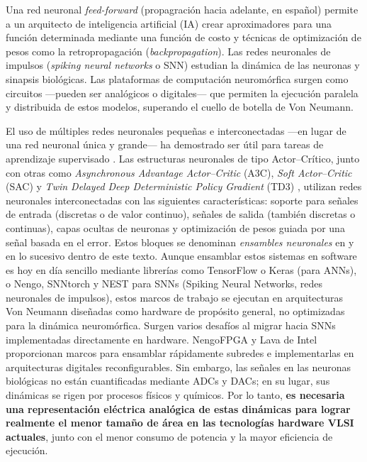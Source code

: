\documentclass[letter, 12pt]{article}
\begin{document}
Una red neuronal \textit{feed-forward} (propagración hacia adelante, en español) permite a un arquitecto de inteligencia artificial (IA) crear aproximadores para una función determinada mediante una función de costo y técnicas de optimización de pesos como la retropropagación (\textit{backpropagation}). Las redes neuronales de impulsos (\textit{spiking neural networks} o SNN) estudian la dinámica de las neuronas y sinapsis biológicas. Las plataformas de computación neuromórfica surgen como circuitos —pueden ser analógicos o digitales— que permiten la ejecución paralela y distribuida de estos modelos, superando el cuello de botella de Von Neumann.


El uso de múltiples redes neuronales pequeñas e interconectadas —en lugar de una red neuronal única y grande— ha demostrado ser útil para tareas de aprendizaje supervisado \cite{Zanatta2024}. Las estructuras neuronales de tipo Actor--Crítico, junto con otras como \textit{Asynchronous Advantage Actor--Critic} (A3C), \textit{Soft Actor--Critic} (SAC) y \textit{Twin Delayed Deep Deterministic Policy Gradient} (TD3) \cite{Sutton}, utilizan redes neuronales interconectadas con las siguientes características: soporte para señales de entrada (discretas o de valor continuo), señales de salida (también discretas o continuas), capas ocultas de neuronas y optimización de pesos guiada por una señal basada en el error. Estos bloques se denominan \emph{ensambles neuronales} en \cite{Morcos2019, Marrero2024NEF} y en lo sucesivo dentro de este texto. Aunque ensamblar estos sistemas en software es hoy en día sencillo mediante librerías como TensorFlow o Keras (para ANNs), o Nengo, SNNtorch y NEST para SNNs (Spiking Neural Networks, redes neuronales de impulsos), estos marcos de trabajo se ejecutan en arquitecturas Von Neumann diseñadas como hardware de propósito general, no optimizadas para la dinámica neuromórfica. Surgen varios desafíos al migrar hacia SNNs implementadas directamente en hardware. NengoFPGA \cite{Morcos2019} y Lava de Intel \cite{Snyder2024Lava} proporcionan marcos para ensamblar rápidamente subredes e implementarlas en arquitecturas digitales reconfigurables. Sin embargo, las señales en las neuronas biológicas no están cuantificadas mediante ADCs y DACs; en su lugar, sus dinámicas se rigen por procesos físicos y químicos. Por lo tanto, \textbf{es necesaria una representación eléctrica analógica de estas dinámicas para lograr realmente el menor tamaño de área en las tecnologías hardware VLSI actuales}, junto con el menor consumo de potencia y la mayor eficiencia de ejecución.
\end{document}

